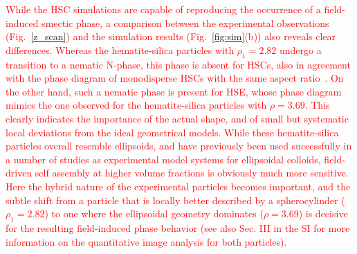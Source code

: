 \documentclass[aps,prl,preprint,superscriptaddress]{revtex4-1} %
\begin{document}
\textcolor{red}{While the HSC simulations are capable of reproducing the occurrence of a field-induced smectic phase, a
  comparison between the experimental observations (Fig.~\ref{z_scan}) and the simulation results
  (Fig.~\ref{fig:sim}(b)) also reveals clear differences. Whereas the hematite-silica particles with $\rho_1=2.82$
  undergo a transition to a nematic N-phase, this phase is absent for HSCs, also in agreement with the phase diagram of
  monodisperse HSCs with the same aspect ratio~\cite{Bolhuis1997}. On the other hand, such a nematic phase is present
  for HSE, whose phase diagram mimics the one observed for the hematite-silica particles with $\rho=3.69$. This clearly
  indicates the importance of the actual shape, and of small but systematic local deviations from the ideal geometrical
  models. While these hematite-silica particles overall resemble ellipsoids, and have previously been used successfully
  in a number of studies as experimental model systems for ellipsoidal colloids, field-driven self assembly at higher
  volume fractions is obviously much more sensitive. Here the hybrid nature of the experimental particles becomes
  important, and the subtle shift from a particle that is locally better described by a spherocylinder ($\rho_1=2.82$)
  to one where the ellipsoidal geometry dominates ($ \rho=3.69$) is decisive for the resulting field-induced phase
behavior (see also Sec. III in the SI for more information on the quantitative image analysis for both particles).}
\end{document}
